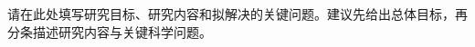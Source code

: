 \begin{GDNSFParagraphs}
请在此处填写研究目标、研究内容和拟解决的关键问题。建议先给出总体目标，再分条描述研究内容与关键科学问题。

\GDNSFBlankPara
\end{GDNSFParagraphs}
